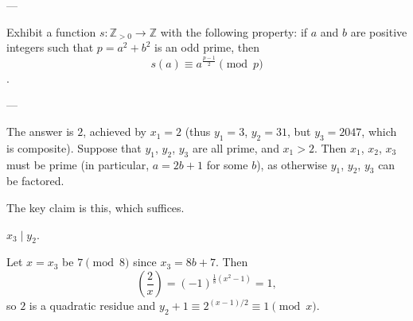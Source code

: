 
---

Exhibit a function $s:\mathbb Z_{>0}\to\mathbb Z$ with the following property: if $a$ and $b$ are positive integers such that $p=a^2+b^2$ is an odd prime, then \[s(a)\equiv a^{\frac{p-1}2}\pmod p\].

---

The answer is $2$, achieved by $x_1=2$ (thus $y_1=3$, $y_2=31$, but $y_3=2047$, which is composite). Suppose that $y_1$, $y_2$, $y_3$ are all prime, and $x_1>2$. Then $x_1$, $x_2$, $x_3$ must be prime (in particular, $a=2b+1$ for some $b$), as otherwise $y_1$, $y_2$, $y_3$ can be factored.

The key claim is this, which suffices.
\begin{iclaim*}
    $x_3\mid y_2$.
\end{iclaim*}
Let $x=x_3$ be $7\pmod8$ since $x_3=8b+7$. Then \[\left(\frac2x\right)=(-1)^{\frac18(x^2-1)}=1,\]
so $2$ is a quadratic residue and $y_2+1\equiv2^{(x-1)/2}\equiv1\pmod x$.
